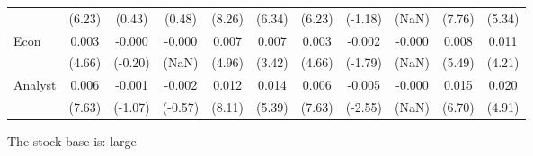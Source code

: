 \documentclass[
]{article}
\begin{document}
\begin{table}[H]
{\begin{tabular}{lcccccccccc}
   & (6.23) & (0.43) & (0.48) & (8.26) & (6.34) & (6.23) & (-1.18) & (NaN) & (7.76) & (5.34) \\ 
  Econ & 0.003 & -0.000 & -0.000 & 0.007 & 0.007 & 0.003 & -0.002 & -0.000 & 0.008 & 0.011 \\ 
   & (4.66) & (-0.20) & (NaN) & (4.96) & (3.42) & (4.66) & (-1.79) & (NaN) & (5.49) & (4.21) \\ 
  Analyst & 0.006 & -0.001 & -0.002 & 0.012 & 0.014 & 0.006 & -0.005 & -0.000 & 0.015 & 0.020 \\ 
   & (7.63) & (-1.07) & (-0.57) & (8.11) & (5.39) & (7.63) & (-2.55) & (NaN) & (6.70) & (4.91) \\ 
   \hline 
\end{tabular}
}
\end{table}

The stock base is: large
\end{document}

